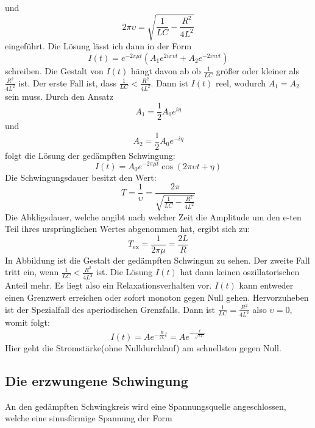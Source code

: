 und
\begin{equation*}
  2 \pi \upsilon = \sqrt{\frac{1}{LC}-\frac{R^2}{4L^2}}
\end{equation*}
eingeführt.
Die Lösung lässt ich dann in der Form
\begin{equation}
  I(t)= e^{-  2\pi \mu t} (A_1 e^{2 i \pi \upsilon t} + A_2 e^{-2 i \pi \upsilon t})
\end{equation}
schreiben.
Die Gestalt von $I(t)$ hängt davon ab ob $\frac{1}{LC}$ größer oder kleiner als $\frac{R^2}{4L^2}$ ist.
Der erste Fall ist, dass $\frac{1}{LC}<\frac{R^2}{4L^2}$.
Dann ist $I(t)$ reel, wodurch $A_1=A_2$ sein muss.
Durch den Ansatz
\begin{equation}
  A_1 = \frac{1}{2}A_0 e^{i \eta}
\end{equation}
und
\begin{equation}
A_2 = \frac{1}{2}A_0 e^{-i \eta}
\end{equation}
folgt die Lösung der gedämpften Schwingung:
\begin{equation}
  I(t) = A_0 e^{- 2 \pi \mu t} \cos(2 \pi \upsilon t + \eta)
\end{equation}
Die Schwingungsdauer besitzt den Wert:
\begin{equation}
  T = \frac{1}{\upsilon}=\frac{2 \pi}{\sqrt{\frac{1}{LC}-\frac{R^2}{4L^2}}}
\end{equation}
Die Abkligsdauer, welche angibt nach welcher Zeit die Amplitude um den e-ten Teil ihres ursprünglichen Wertes abgenommen hat, ergibt sich zu:
\begin{equation}
  T_\text{ex}=\frac{1}{2 \pi \mu}=\frac{2L}{R}
\end{equation}
In Abbildung ist die Gestalt der gedämpften Schwingun zu sehen.
Der zweite Fall tritt ein, wenn $\frac{1}{LC}<\frac{R^2}{4L^2}$ ist.
Die Lösung $I(t)$ hat dann keinen oszillatorischen Anteil mehr.
Es liegt also ein Relaxationsverhalten vor.
$I(t)$ kann entweder einen Grenzwert erreichen oder sofort monoton gegen Null gehen.
Hervorzuheben ist der Spezialfall des aperiodischen Grenzfalls.
Dann ist $\frac{1}{LC}=\frac{R^2}{4L^2}$ also $\upsilon=0$, womit folgt:
\begin{equation}
  I(t)=Ae^{-\frac{R}{2L}t}=Ae^{-\frac{t}{\sqrt{LC}}}
\end{equation}
Hier geht die Stromstärke(ohne Nulldurchlauf) am schnellsten gegen Null.
\subsection{Die erzwungene Schwingung}
An den gedämpften Schwingkreis wird eine Spannungsquelle angeschlossen, welche eine sinusförmige Spannung der Form

